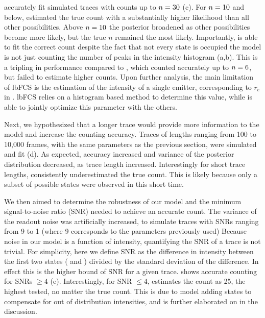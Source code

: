 \ours accurately fit simulated traces with counts up to $n=30$ (c).
	For $n=10$ and below, \ours estimated the true count with a substantially 
	higher likelihood than all other possibilities. 
	Above $n=10$ the posterior broadened as other possibilities become more likely, 
	but the true $n$ remained the most likely.
	Importantly, \ours is able to fit the correct count despite the fact that 
	not every state is occupied \ie the model is not just counting the 
	number of peaks in the intensity histogram (a,b).
	This is a tripling in performance compared to \lbfcs, which counted 
	accurately up to $n=6$, but failed to estimate higher counts.
	Upon further analysis, the main limitation of lbFCS is the estimation of the 
	intensity of a single emitter, corresponding to $r_e$ in \ours. 
	lbFCS relies on a histogram based method to determine this value, while 
	\ours is able to jointly optimize this parameter with the others.

Next, we hypothesized that a longer trace would provide more 
information to the model and increase the counting accuracy.
	Traces of lengths ranging from 100 to 10,000 frames, with the same parameters 
	as the previous section, were simulated and fit (d).
	As expected, accuracy increased and variance of the posterior distribution decreased, 
	as trace length increased.
	Interestingly for short trace lengths, \ours consistently underestimated the true count. 
	This is likely because only a subset of possible states were observed in this short time. %

We then aimed to determine the robustness of our model and the minimum signal-to-noise ratio 
(SNR) needed to achieve an accurate count.
	The variance of the readout noise \camvar was artificially increased, 
	to simulate traces with SNRs ranging from 9 to 1 (where 9 
	corresponds to the parameters previously used)
	Because noise in our model is a function of intensity, quantifying the SNR of a trace 
	is not trivial. 
	For simplicity, here we define SNR as the difference in intensity between 
	the first two states ( and ) divided by the standard deviation of the difference. 
	In effect this is the higher bound of SNR for a given trace. 
	\ours shows accurate counting for SNRs $\geq 4$ (e). 
	Interestingly, for  SNR $\leq 4$, \ours estimates the count as 25, 
	the highest \n tested, no matter the true count. 
	This is due to model adding states to compensate for out of distribution intensities, 
	and is further elaborated on in the discussion. 

